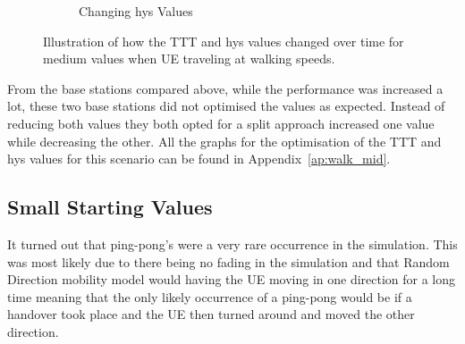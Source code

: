 \begin{figure}[H]
\begin{subfigure}[b]{0.49\textwidth}
                \caption{Changing hys Values}
                \label{fig:walk_mid_hys}
        \end{subfigure}
        \caption{Illustration of how the TTT and hys values changed over time for medium values when UE traveling at walking speeds.}\label{fig:walk_mid_ttthys}
\end{figure}
From the base stations compared above, while the performance was increased a lot, these two base stations did not optimised the values as expected. Instead of reducing both values they both opted for a split approach increased one value while decreasing the other. All the graphs for the optimisation of the TTT and hys values for this scenario can be found in Appendix~\ref{ap:walk_mid}.
\subsection{Small Starting Values}\label{sec:walk_low}
It turned out that ping-pong's were a very rare occurrence in the simulation. This was most likely due to there being no fading in the simulation and that Random Direction mobility model would having the UE moving in one direction for a long time meaning that the only likely occurrence of a ping-pong would be if a handover took place and the UE then turned around and moved the other direction.

